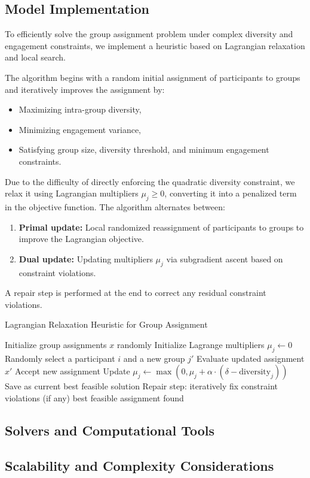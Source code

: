 \subsection*{Model Implementation}

To efficiently solve the group assignment problem under complex diversity and engagement constraints, we implement a heuristic based on Lagrangian relaxation and local search.

The algorithm begins with a random initial assignment of participants to groups and iteratively improves the assignment by:
\begin{itemize}
    \item Maximizing intra-group diversity,
    \item Minimizing engagement variance,
    \item Satisfying group size, diversity threshold, and minimum engagement constraints.
\end{itemize}

Due to the difficulty of directly enforcing the quadratic diversity constraint, we relax it using Lagrangian multipliers $\mu_j \geq 0$, converting it into a penalized term in the objective function. The algorithm alternates between:
\begin{enumerate}
    \item \textbf{Primal update:} Local randomized reassignment of participants to groups to improve the Lagrangian objective.
    \item \textbf{Dual update:} Updating multipliers $\mu_j$ via subgradient ascent based on constraint violations.
\end{enumerate}

A repair step is performed at the end to correct any residual constraint violations.

\begin{algorithm}[H]
\caption*{Lagrangian Relaxation Heuristic for Group Assignment}
\begin{algorithmic}[1]
\State Initialize group assignments $x$ randomly
\State Initialize Lagrange multipliers $\mu_j \gets 0$
        \State Randomly select a participant $i$ and a new group $j'$
            \State Evaluate updated assignment $x'$
                \State Accept new assignment
            \EndIf
        \EndIf
    \EndFor
        \State Update $\mu_j \gets \max(0, \mu_j + \alpha \cdot (\delta - \text{diversity}_j))$
    \EndFor
        \State Save as current best feasible solution
    \EndIf
\EndFor
\State Repair step: iteratively fix constraint violations (if any)
\State \Return best feasible assignment found
\end{algorithmic}
\end{algorithm}

\subsection*{Solvers and Computational Tools}

\subsection*{Scalability and Complexity Considerations}
